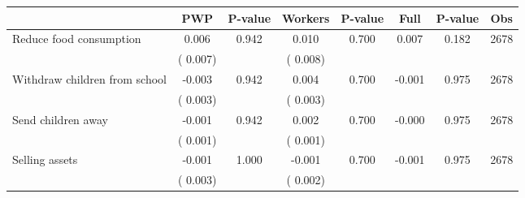 
\begin{tabular}{l*{7}{c}}\hline&\multicolumn{1}{c}{PWP}&\multicolumn{1}{c}{P-value}&\multicolumn{1}{c}{Workers}&\multicolumn{1}{c}{P-value}&\multicolumn{1}{c}{Full}&\multicolumn{1}{c}{P-value}&\multicolumn{1}{c}{Obs} \\ \hline

 Reduce food consumption       &              0.006       &        0.942  &              0.010       &        0.700  &              0.007       &              0.182 &  2678 \\ 
                       &       (       0.007)             &                               &       (       0.008)                     &                               &                                               &                                &                      \\ 

 Withdraw children from school       &             -0.003       &        0.942  &              0.004       &        0.700  &             -0.001       &              0.975 &  2678 \\ 
                       &       (       0.003)             &                               &       (       0.003)                     &                               &                                               &                                &                      \\ 

 Send children away       &             -0.001       &        0.942  &              0.002       &        0.700  &             -0.000       &              0.975 &  2678 \\ 
                       &       (       0.001)             &                               &       (       0.001)                     &                               &                                               &                                &                      \\ 

 Selling assets       &             -0.001       &        1.000  &             -0.001       &        0.700  &             -0.001       &              0.975 &  2678 \\ 
                       &       (       0.003)             &                               &       (       0.002)                     &                               &                                               &                                &                      \\ 


\end{tabular}
